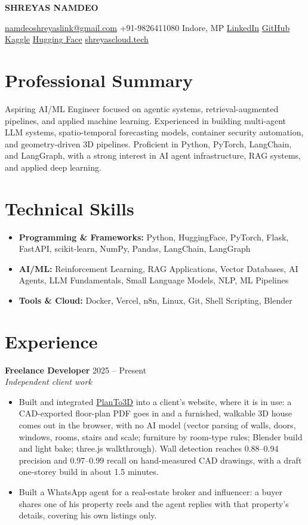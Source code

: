 \documentclass[10pt,letterpaper]{article}
\newcommand{\role}[3]{\textbf{#1} \hfill #3\\ \textit{#2}\par}
\begin{document}
{\color{navy}\LARGE\bfseries SHREYAS NAMDEO}\par\vspace{3pt}
\href{mailto:namdeoshreyaslink@gmail.com}{\color{black}namdeoshreyaslink@gmail.com} \textbar{} +91-9826411080 \textbar{} Indore, MP \textbar{}
\href{https://www.linkedin.com/in/shreyas-namdeo-2119b0290/}{LinkedIn} \textbar{}
\href{https://github.com/23f2005639}{GitHub} \textbar{}
\href{https://www.kaggle.com/maxsn2005}{Kaggle} \textbar{}
\href{https://huggingface.co/maxsn2200}{Hugging Face} \textbar{}
\href{https://www.shreyascloud.tech}{shreyascloud.tech}

\section*{Professional Summary}
Aspiring AI/ML Engineer focused on agentic systems, retrieval-augmented pipelines, and applied machine learning. Experienced in building
multi-agent LLM systems, spatio-temporal forecasting models, container security automation, and geometry-driven 3D pipelines. Proficient
in Python, PyTorch, LangChain, and LangGraph, with a strong interest in AI agent infrastructure, RAG systems, and applied deep learning.

\section*{Technical Skills}
\begin{itemize}
  \item \textbf{Programming \& Frameworks:} Python, HuggingFace, PyTorch, Flask, FastAPI, scikit-learn, NumPy, Pandas, LangChain, LangGraph
  \item \textbf{AI/ML:} Reinforcement Learning, RAG Applications, Vector Databases, AI Agents, LLM Fundamentals, Small Language Models, NLP, ML Pipelines
  \item \textbf{Tools \& Cloud:} Docker, Vercel, n8n, Linux, Git, Shell Scripting, Blender
\end{itemize}

\section*{Experience}
\role{Freelance Developer}{Independent client work}{2025 -- Present}
\begin{itemize}
  \item Built and integrated \href{https://github.com/23f2005639/planTo3D}{PlanTo3D} into a client's website, where it is in use: a CAD-exported
  floor-plan PDF goes in and a furnished, walkable 3D house comes out in the browser, with no AI model (vector parsing of walls, doors, windows,
  rooms, stairs and scale; furniture by room-type rules; Blender build and light bake; three.js walkthrough). Wall detection reaches 0.88--0.94
  precision and 0.97--0.99 recall on hand-measured CAD drawings, with a draft one-storey build in about 1.5 minutes.
  \item Built a WhatsApp agent for a real-estate broker and influencer: a buyer shares one of his property reels and the agent replies with that
  property's details, covering his own listings only.
\end{itemize}
\end{document}
